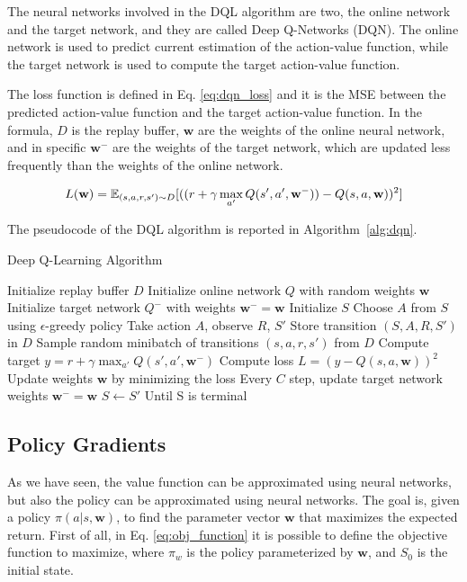 The neural networks involved in the DQL algorithm are two, the online network and the target network, and they are called Deep Q-Networks (DQN).
The online network is used to predict current estimation of the action-value function, while the target network is used to compute the target action-value function.

The loss function is defined in Eq. \ref{eq:dqn_loss} and it is the MSE between the predicted action-value function and the target action-value function.
In the formula, $D$ is the replay buffer, $\textbf{w}$ are the weights of the online neural network, and in specific $\textbf{w}^-$ are the weights of the target network, which are updated less frequently than the weights of the online network.


\begin{equation} \label{eq:dqn_loss}
    L(\textbf{w}) = \operatorname{\mathbb{E}}_{(s, a, r, s') \sim D} [((r + \gamma \max_{a'} Q(s', a', \textbf{w}^-)) - Q(s, a, \textbf{w}))^2]
\end{equation}

The pseudocode of the DQL algorithm is reported in Algorithm~\ref{alg:dqn}.

\begin{algorithm}
\caption{Deep Q-Learning Algorithm}\label{alg:dqn}
\begin{algorithmic}
\State Initialize replay buffer $D$
\State Initialize online network $Q$ with random weights $\textbf{w}$
\State Initialize target network $Q^-$ with weights $\textbf{w}^- = \textbf{w}$
    \State Initialize $S$
        \State Choose $A$ from $S$ using $\epsilon$-greedy policy
        \State Take action $A$, observe $R$, $S'$
        \State Store transition $(S, A, R, S')$ in $D$
        \State Sample random minibatch of transitions $(s, a, r, s')$ from $D$
        \State Compute target $y = r + \gamma \max_{a'} Q(s', a', \textbf{w}^-)$
        \State Compute loss $L = (y - Q(s, a, \textbf{w}))^2$
        \State Update weights $\textbf{w}$ by minimizing the loss
        \State Every $C$ step, update target network weights $\textbf{w}^- = \textbf{w}$
        \State $S \leftarrow S'$
    \EndFor
\State Until S is terminal
\EndFor
\end{algorithmic}
\end{algorithm}





\subsection{Policy Gradients}\label{subsec:policy_gradients}
As we have seen, the value function can be approximated using neural networks, but also the policy can be approximated using neural networks.
The goal is, given a policy $\pi(a|s, \textbf{w})$, to find the parameter vector $\textbf{w}$ that maximizes the expected return.
First of all, in Eq. \ref{eq:obj_function} it is possible to define the objective function to maximize, where $\pi_w$ is the policy parameterized by $\textbf{w}$, and $S_0$ is the initial state.


